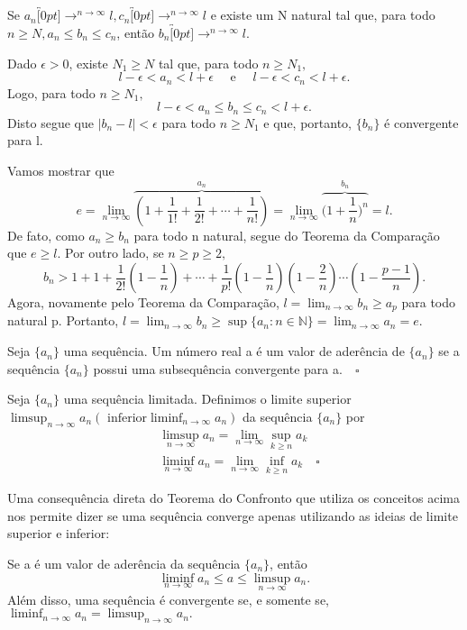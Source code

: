 \documentclass[analysis_notes.tex]{subfiles}
\begin{document}
\begin{theorem*}
	Se $a_{n}\overbracket[0pt]{\longrightarrow}^{n\to \infty}l, c_{n}\overbracket[0pt]{\longrightarrow}^{n\to \infty}l$ e existe um
	N natural tal que, para todo $n\geq{N}, a_{n}\leq{b_{n}}\leq{c_{n}}$, ent\~ao $b_{n}\overbracket[0pt]{\longrightarrow}^{n\to \infty}l.$
\end{theorem*}
\begin{proof*}
	Dado $\epsilon>0$, existe $N_{1}\geq{N}$ tal que, para todo $n\geq{N_{1}},$
	$$
		l - \epsilon < a_{n} < l + \epsilon\quad\text{ e }\quad l-\epsilon < c_{n} < l+\epsilon.
	$$
	Logo, para todo $n\geq{N_{1}},$
	$$
		l - \epsilon < a_{n}\leq{b_{n}}\leq{c_{n}}<l + \epsilon.
	$$
	Disto segue que $|b_{n} - l|< \epsilon$ para todo $n\geq{N_{1}}$ e que, portanto, $\{b_{n}\} $ \'e convergente para l. \qedsymbol
\end{proof*}
\begin{example}
	Vamos mostrar que
	$$
		e = \lim_{n\to\infty}\overbrace{(1 + \frac{1}{1!} + \frac{1}{2!} + \cdots + \frac{1}{n!})}^{a_{n}} = \lim_{n\to\infty}\overbrace{\biggl(1 + \frac{1}{n}\biggr)^{n}}^{b_{n}} = l.
	$$
	De fato, como $a_{n} \geq{b_{n}}$ para todo n natural, segue do Teorema da Compara\c c\~ao que $e\geq{l}.$ Por outro lado, se
	$n\geq{p}\geq{2},$
	$$
		b_{n} > 1 + 1 + \frac{1}{2!}(1-\frac{1}{n})+\cdots+\frac{1}{p!}(1-\frac{1}{n})(1-\frac{2}{n})\cdots(1-\frac{p-1}{n}).
	$$
	Agora, novamente pelo Teorema da Compara\c c\~ao, $l = \displaystyle \lim_{n\to\infty}b_{n}\geq{a_{p}}$ para todo natural p.
	Portanto, $l = \displaystyle \lim_{n\to\infty}b_{n}\geq{\sup\{a_{n}:n\in \mathbb{N}\}} = \lim_{n\to\infty}a_{n} = e.$ \qedsymbol
\end{example}
\begin{def*}
	Seja $\{a_{n}\} $ uma sequ\^encia. Um n\'umero real a \'e um valor de ader\^encia de $\{a_{n}\} $ se a sequ\^encia $\{a_{n}\}$ possui
	uma subsequ\^encia convergente para a.$\quad\square$
\end{def*}
\begin{def*}
	Seja $\{a_{n}\} $  uma sequ\^encia limitada. Definimos o limite superior $\displaystyle\limsup_{n\to\infty}a_{n}(\text{ inferior}\liminf_{n\to\infty}a_{n})$ da
	sequ\^encia $\{a_{n}\} $ por
	\begin{align*}
		 & \limsup_{n\to\infty}a_{n} = \lim_{n\to\infty}\sup_{k\geq{n}}a_{k}             \\
		 & \liminf_{n\to\infty}a_{n} = \lim_{n\to\infty}\inf_{k\geq{n}}a_{k}\quad\square
	\end{align*}
\end{def*}
Uma consequ\^encia direta do Teorema do Confronto que utiliza os conceitos acima nos permite dizer se uma sequ\^encia converge apenas
utilizando as ideias de limite superior e inferior:
\begin{theorem*}
	Se a \'e um valor de ader\^encia da sequ\^encia $\{a_{n}\} $, ent\~ao
	$$
		\liminf_{n\to\infty}a_{n}\leq{a}\leq{\limsup_{n\to\infty}a_{n}}.
	$$
	Al\'em disso, uma sequ\^encia \'e convergente se, e somente se, $\liminf_{n\to\infty}a_{n} = \limsup_{n\to\infty}a_{n}.$
\end{theorem*}
\end{document}
